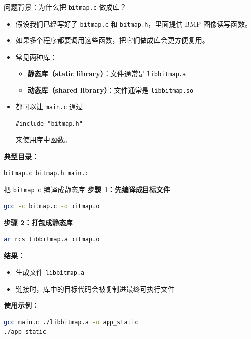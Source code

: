 \documentclass[aspectratio=169,11pt]{beamer}
\begin{document}
\begin{frame}{问题背景：为什么把 \texttt{bitmap.c} 做成库？}
\begin{itemize}
  \item 假设我们已经写好了 \texttt{bitmap.c} 和 \texttt{bitmap.h}，里面提供 BMP 图像读写函数。
  \item 如果多个程序都要调用这些函数，把它们做成\alert{库}会更方便复用。
  \item 常见两种库：
  \begin{itemize}
    \item \textbf{静态库（static library）}：文件通常是 \texttt{libbitmap.a}
    \item \textbf{动态库（shared library）}：文件通常是 \texttt{libbitmap.so}
  \end{itemize}
  \item 都可以让 \texttt{main.c} 通过
  \begin{center}
    \texttt{\#include "bitmap.h"}
  \end{center}
  来使用库中函数。
\end{itemize}

\vspace{0.5em}
\textbf{典型目录：}
\begin{center}
\texttt{bitmap.c \quad bitmap.h \quad main.c}
\end{center}
\end{frame}

\begin{frame}[fragile]{把 \texttt{bitmap.c} 编译成静态库}
\textbf{步骤 1：先编译成目标文件}
\begin{lstlisting}[language=bash]
gcc -c bitmap.c -o bitmap.o
\end{lstlisting}

\textbf{步骤 2：打包成静态库}
\begin{lstlisting}[language=bash]
ar rcs libbitmap.a bitmap.o
\end{lstlisting}

\textbf{结果：}
\begin{itemize}
  \item 生成文件 \texttt{libbitmap.a}
  \item 链接时，库中的目标代码会被复制进最终可执行文件
\end{itemize}

\textbf{使用示例：}
\begin{lstlisting}[language=bash]
gcc main.c ./libbitmap.a -o app_static
./app_static
\end{lstlisting}
\end{frame}
\end{document}
